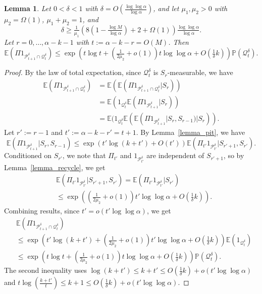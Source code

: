 \documentclass{article}
\theoremstyle{plain}
\theoremstyle{remark}
\theoremstyle{plain}
\newtheorem{lemma}[theorem]{Lemma}
\numberwithin{equation}{section}
\begin{document}
	\begin{lemma}\label{lemma_pipt}
		Let $0<\delta<1$ with $\delta=O(\tfrac{\log\log\alpha}{\log\alpha})$, and let $\mu_1,\mu_2>0$ with $\mu_2=\Omega(1)$, $\mu_1+\mu_2=1$, and $$\delta\geq\tfrac1{\mu_1}\left(8\left(1-\tfrac{\log M}{\log\alpha}\right)+2+\Omega(1)\right)\tfrac{\log\log\alpha}{\log\alpha}.$$ Let $r=0,\ldots,\alpha-k-1$ with $t:=\alpha-k-r=O(M)$. Then $$\mathbb{E}(\Pi1_{\mathcal{P}_{t+1}^{\delta}\cap\mathcal{Q}_t^{\delta}})\leq\exp\left(t\log t+(\tfrac1{2\mu_2}+o(1))t\log\log\alpha+O(\tfrac1{\delta}k)\right)\mathbb{P}(\mathcal{Q}_t^{\delta}).$$
	\end{lemma}
	
	\begin{proof}
		By the law of total expectation, since $\mathcal{Q}_t^{\delta}$ is $S_r$-measurable, we have
		\begin{align}
			\mathbb{E}(\Pi1_{\mathcal{P}_{t+1}^{\delta}\cap\mathcal{Q}_t^{\delta}})
			&=\mathbb{E}(\mathbb{E}(\Pi1_{\mathcal{P}_{t+1}^{\delta}\cap\mathcal{Q}_t^{\delta}}|S_r))
			\\&=\mathbb{E}(1_{\mathcal{Q}_t^{\delta}}\mathbb{E}(\Pi1_{\mathcal{P}_{t+1}^{\delta}}|S_r))
			\\&=\mathbb{E}(1_{\mathcal{Q}_t^{\delta}}\mathbb{E}(\mathbb{E}(\Pi1_{\mathcal{P}_{t+1}^{\delta}}|S_r,S_{r-1})|S_r)).
		\end{align}
		Let $r':=r-1$ and $t':=\alpha-k-r'=t+1$. By Lemma~\ref{lemma_pit}, we have $$\mathbb{E}(\Pi1_{\mathcal{P}_{t+1}^{\delta}}|S_r,S_{r-1})\leq\exp(t'\log(k+t')+O(t'))\mathbb{E}(\Pi_{t'}1_{\mathcal{P}_{t'}^{\delta}}|S_{r'+1},S_{r'}).$$ Conditioned on $S_{r'}$, we note that $\Pi_{t'}$ and $1_{\mathcal{P}_{t'}^{\delta}}$ are independent of $S_{r'+1}$, so by Lemma~\ref{lemma_recycle}, we get
		\begin{align}
			&\mathbb{E}(\Pi_{t'}1_{\mathcal{P}_{t'}^{\delta}}|S_{r'+1},S_{r'})
			=\mathbb{E}(\Pi_{t'}1_{\mathcal{P}_{t'}^{\delta}}|S_{r'})
			\\&\leq\exp\left((\tfrac1{2\mu_2}+o(1))t'\log\log\alpha+O(\tfrac1{\delta}k)\right).
		\end{align}
		Combining results, since $t'=o(t'\log\log\alpha)$, we get
		\begin{align}
			&\mathbb{E}(\Pi1_{\mathcal{P}_{t+1}^{\delta}\cap\mathcal{Q}_t^{\delta}})
			\\&\leq\exp\left(t'\log(k+t')+(\tfrac1{2\mu_2}+o(1))t'\log\log\alpha+O(\tfrac1{\delta}k)\right)\mathbb{E}(1_{\mathcal{Q}_t^{\delta}})
			\\&\leq\exp\left(t\log t+(\tfrac1{2\mu_2}+o(1))t\log\log\alpha+O(\tfrac1{\delta}k)\right)\mathbb{P}(\mathcal{Q}_t^{\delta}).
		\end{align}
		The second inequality uses $\log(k+t')\leq k+t'\leq O(\tfrac1{\delta}k)+o(t'\log\log\alpha)$ and $t\log(\tfrac{k+t'}{t})\leq k+1\leq O(\tfrac1{\delta}k)+o(t'\log\log\alpha)$.
	\end{proof}
	
\end{document}
